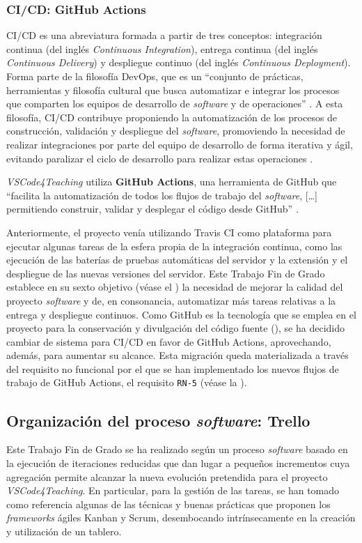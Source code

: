 \subsubsection{CI/CD: GitHub Actions}
\label{subsec:herCiCd}
CI/CD es una abreviatura formada a partir de tres conceptos: integración continua (del inglés \textit{Continuous Integration}), entrega continua (del inglés \textit{Continuous Delivery}) y despliegue continuo (del inglés \textit{Continuous Deployment}). Forma parte de la filosofía DevOps, que es un ``conjunto de prácticas, herramientas y filosofía cultural que busca automatizar e integrar los procesos que comparten los equipos de desarrollo de \textit{software} y de operaciones'' \cite{DevOps}. A esta filosofía, CI/CD contribuye proponiendo la automatización de los procesos de construcción, validación y despliegue del \textit{software}, promoviendo la necesidad de realizar integraciones por parte del equipo de desarrollo de forma iterativa y ágil, evitando paralizar el ciclo de desarrollo para realizar estas operaciones \cite{CICDRedHat,CICDGitlab}.

\textit{VSCode4Teaching} utiliza \textbf{GitHub Actions}, una herramienta de GitHub que ``facilita la automatización de todos los flujos de trabajo del \textit{software}, [\dots] permitiendo construir, validar y desplegar el código desde GitHub'' \cite{GitHubActions}.

Anteriormente, el proyecto venía utilizando Travis CI como plataforma para ejecutar algunas tareas de la esfera propia de la integración continua, como las ejecución de las baterías de pruebas automáticas del servidor y la extensión y el despliegue de las nuevas versiones del servidor. Este Trabajo Fin de Grado establece en su sexto objetivo (véase el ) la necesidad de mejorar la calidad del proyecto \textit{software} y de, en consonancia, automatizar más tareas relativas a la entrega y despliegue continuos. Como GitHub es la tecnología que se emplea en el proyecto para la conservación y divulgación del código fuente (), se ha decidido cambiar de sistema para CI/CD en favor de GitHub Actions, aprovechando, además, para aumentar su alcance. Esta migración queda materializada a través del requisito no funcional por el que se han implementado los nuevos flujos de trabajo de GitHub Actions, el requisito \texttt{RN-5} (véase la ).

\subsection{Organización del proceso \textit{software}: Trello}
\label{sec:herTrello}
Este Trabajo Fin de Grado se ha realizado según un proceso \textit{software} basado en la ejecución de iteraciones reducidas que dan lugar a pequeños incrementos cuya agregación permite alcanzar la nueva evolución pretendida para el proyecto \textit{VSCode4Teaching}. En particular, para la gestión de las tareas, se han tomado como referencia algunas de las técnicas y buenas prácticas que proponen los \textit{frameworks} ágiles Kanban y Scrum, desembocando intrínsecamente en la creación y utilización de un tablero.

